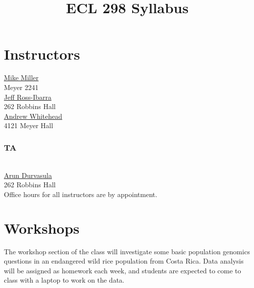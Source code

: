 \documentclass[]{article}
\begin{document}
\title{ECL 298 Syllabus}
\maketitle







\section*{Instructors}

\href{mailto:micmiller@ucdavis.edu}{Mike Miller}\\
Meyer 2241\\

\noindent \href{mailto:rossibarra@ucdavis.edu}{Jeff Ross-Ibarra}\\
262 Robbins Hall\\

\noindent \href{mailto:awhitehead@ucdavis.edu}{Andrew Whitehead}\\
4121 Meyer Hall\\

\subsubsection*{TA}\\
\href{mailto:adurvasula@ucdavis.edu}{Arun Durvasula}\\
262 Robbins Hall\\

\noindent Office hours for all instructors are by appointment.

\section*{Workshops}
The workshop section of the class will investigate some basic population genomics questions in an endangered wild rice population from Costa Rica. Data analysis will be assigned as homework each week, and students are expected to come to class with a laptop to work on the data.  
\end{document}
